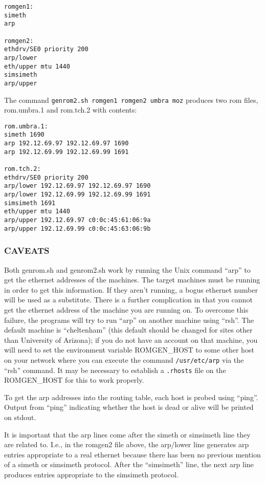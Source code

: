 \begin{verbatim}
romgen1:
simeth
arp

romgen2:
ethdrv/SE0 priority 200 
arp/lower
eth/upper mtu 1440
simsimeth
arp/upper
\end{verbatim}

The command {\tt genrom2.sh romgen1 romgen2 umbra moz} produces two rom
files, rom.umbra.1 and rom.tch.2 with contents:

\begin{verbatim}
rom.umbra.1:
simeth 1690
arp 192.12.69.97 192.12.69.97 1690
arp 192.12.69.99 192.12.69.99 1691

rom.tch.2:
ethdrv/SE0 priority 200
arp/lower 192.12.69.97 192.12.69.97 1690
arp/lower 192.12.69.99 192.12.69.99 1691
simsimeth 1691
eth/upper mtu 1440
arp/upper 192.12.69.97 c0:0c:45:61:06:9a
arp/upper 192.12.69.99 c0:0c:45:63:06:9b
\end{verbatim}

\subsubsection{CAVEATS}

Both genrom.sh and genrom2.sh work by running the Unix command ``arp''
to get the ethernet addresses of the machines.  The target machines
must be running in order to get this information.  If they aren't
running, a bogus ethernet number will be used as a substitute.  There
is a further complication in that you cannot get the ethernet address
of the machine you are running on.  To overcome this failure, the
programs will try to run ``arp'' on another machine using ``rsh''.
The default machine is ``cheltenham'' (this default should be changed
for sites other than University of Arizona); if you do not have an
account on that machine, you will need to set the environment variable
ROMGEN\_HOST to some other host on your network where you can execute
the command {\tt /usr/etc/arp} via the ``rsh'' command.  It may be
necessary to establish a {\tt .rhosts} file on the ROMGEN\_HOST for
this to work properly.

To get the arp addresses into the routing table, each host is probed
using ``ping''.  Output from ``ping'' indicating whether the host is
dead or alive will be printed on stdout.

It is important that the arp lines come after the simeth or simsimeth
line they are related to.  I.e., in the romgen2 file above, the arp/lower
line generates arp entries appropriate to a real ethernet because there
has been no previous mention of a simeth or simsimeth protocol.
After the ``simsimeth'' line, the next arp line produces entries appropriate
to the simsimeth protocol.

